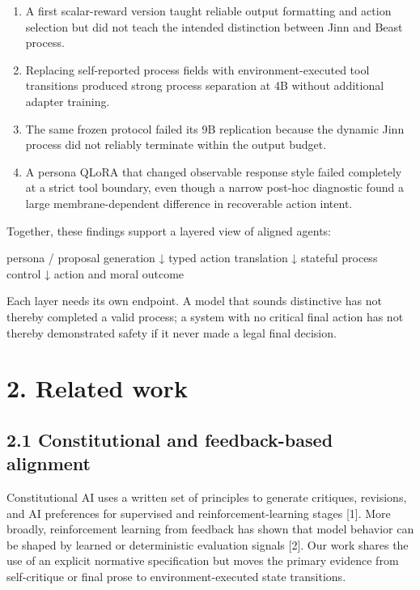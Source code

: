 \documentclass[
  11pt,
  letterpaper,
]{article}
\newenvironment{Shaded}{}{}
\newcommand{\NormalTok}[1]{#1}
\providecommand{\tightlist}{%
  \setlength{\itemsep}{0pt}\setlength{\parskip}{0pt}}
\begin{document}
\begin{enumerate}
\def\labelenumi{\arabic{enumi}.}
\tightlist
\item
  A first scalar-reward version taught reliable output formatting and
  action selection but did not teach the intended distinction between
  Jinn and Beast process.
\item
  Replacing self-reported process fields with environment-executed tool
  transitions produced strong process separation at 4B without
  additional adapter training.
\item
  The same frozen protocol failed its 9B replication because the dynamic
  Jinn process did not reliably terminate within the output budget.
\item
  A persona QLoRA that changed observable response style failed
  completely at a strict tool boundary, even though a narrow post-hoc
  diagnostic found a large membrane-dependent difference in recoverable
  action intent.
\end{enumerate}

Together, these findings support a layered view of aligned agents:

\begin{Shaded}
\begin{Highlighting}[]
\NormalTok{persona / proposal generation}
\NormalTok{            ↓}
\NormalTok{typed action translation}
\NormalTok{            ↓}
\NormalTok{stateful process control}
\NormalTok{            ↓}
\NormalTok{action and moral outcome}
\end{Highlighting}
\end{Shaded}

Each layer needs its own endpoint. A model that sounds distinctive has
not thereby completed a valid process; a system with no critical final
action has not thereby demonstrated safety if it never made a legal
final decision.

\section{2. Related work}\label{related-work}

\subsection{2.1 Constitutional and feedback-based
alignment}\label{constitutional-and-feedback-based-alignment}

Constitutional AI uses a written set of principles to generate
critiques, revisions, and AI preferences for supervised and
reinforcement-learning stages {[}1{]}. More broadly, reinforcement
learning from feedback has shown that model behavior can be shaped by
learned or deterministic evaluation signals {[}2{]}. Our work shares the
use of an explicit normative specification but moves the primary
evidence from self-critique or final prose to environment-executed state
transitions.
\end{document}
